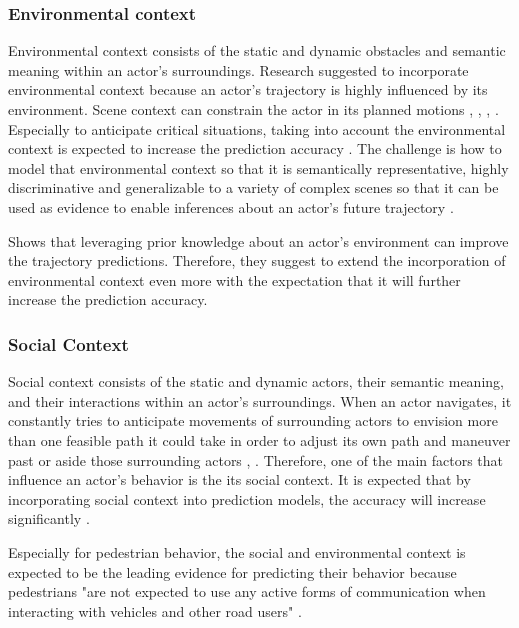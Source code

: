 \subsubsection{Environmental context}
Environmental context consists of the static and dynamic obstacles and semantic meaning within an actor's surroundings.
Research suggested to incorporate environmental context because an actor's trajectory is highly influenced by its environment. Scene context can constrain the actor in its planned motions \cite{chou2020predicting}, \cite{pfeiffer2018data}, \cite{sadeghian2019sophie}, \cite{manh2018scene}. Especially to anticipate critical situations, taking into account the environmental context is expected to increase the prediction accuracy \cite{uah2020d4}. The challenge is how to model that environmental context so that it is semantically representative, highly discriminative and generalizable to a variety of complex scenes so that it can be used as evidence to enable inferences about an actor's future trajectory \cite{varshneya2017human}.

\cite{pool2017using} Shows that leveraging prior knowledge about an actor's environment can improve the trajectory predictions. Therefore, they suggest to extend the incorporation of environmental context even more with the expectation that it will further increase the prediction accuracy.  


\subsubsection{Social Context}
Social context consists of the static and dynamic actors, their semantic meaning, and their interactions within an actor's surroundings.
When an actor navigates, it constantly tries to anticipate movements of surrounding actors to envision more than one feasible path it could take in order to adjust its own path and maneuver past or aside those surrounding actors \cite{sadeghian2019sophie}, \cite{manh2018scene}. Therefore, one of the main factors that influence an actor's behavior is the its social context. It is expected that by incorporating social context into prediction models, the accuracy will increase significantly \cite{pfeiffer2018data}. 

Especially for pedestrian behavior, the social and environmental context is expected to be the leading evidence for predicting their behavior because pedestrians "are not expected to use any active forms of communication when interacting with vehicles and other road users" \cite{uah2020d4}. 


